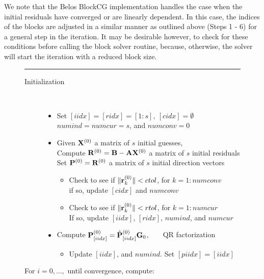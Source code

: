 \documentclass{article}
\newcommand{\bA}{{\bf A}}
\newcommand{\bB}{{\bf B}}
\newcommand{\bG}{{\bf G}}
\newcommand{\bP}{{\bf P}}
\newcommand{\bR}{{\bf R}}
\newcommand{\bX}{{\bf X}}
\newcommand{\br}{{\bf r}}
\begin{document}
We note that the Belos BlockCG implementation handles the case
when the initial residuals have converged or are linearly
dependent. In this case, the indices of the blocks are adjusted in
a similar manner as outlined above (Steps 1 - 6) for a general
step in the iteration. It may be desirable however, to check for
these conditions before calling the block solver routine, because,
otherwise, the solver will start the iteration with a reduced
block size.


{\small
\begin{figure}
\vspace{.05in} \hrule  \vspace{.1in}
\begin{description}
\item[Initialization] ~~~~
\begin{itemize}
 \item Set $[iidx] = [ridx] = [1:s], ~ [cidx] = \emptyset$ \\
 $numind = numcur = s$, and $numconv = 0$
 \item Given $\bX^{(0)}$ a matrix of $s$ initial guesses, \\
       Compute $\bR^{(0)} = \bB - \bA \bX^{(0)}$ a matrix of $s$
       initial residuals \\
       Set $\bP^{(0)} = \bR^{(0)}$ a matrix of $s$ initial
       direction vectors
       \begin{itemize}
       \item Check to see if $\| \br_k^{(0)} \| < ctol$, for $k =
       1:numconv$ \\
       if so, update $[cidx]$ and $numconv$
       \item Check to see if $\| \br_k^{(0)} \| < rtol$, for $k =
       1:numcur$ \\
       If so, update $[iidx]$, $[ridx]$, $numind$, and $numcur$
       \end{itemize}
 \item Compute $\bP^{(0)}_{[iidx]} = {\hat \bP}^{(0)}_{[iidx]}
 \bG_{0}$,~~~~QR factorization
 \begin{itemize}
 \item Update $[iidx]$, and $numind$. Set $[piidx] = [iidx]$
 \end{itemize}
 \end{itemize}
 \item[For $i=0,\ldots,$ until convergence, compute:]~~
\end{description}
\end{figure}}
\end{document}
